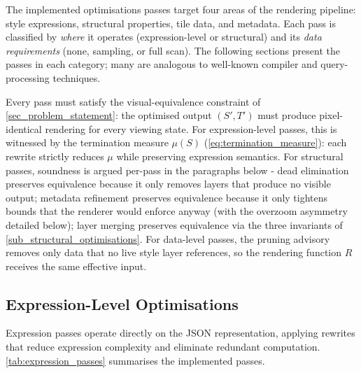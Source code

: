 The implemented optimisations passes target four areas of the rendering pipeline: style expressions, structural properties, tile data, and metadata.
Each pass is classified by \emph{where} it operates (expression-level or structural) and its \emph{data requirements} (none, sampling, or full scan).
The following sections present the passes in each category; many are analogous to well-known compiler and query-processing techniques.

Every pass must satisfy the visual-equivalence constraint of \cref{sec_problem_statement}: the optimised output $(S', T')$ must produce pixel-identical rendering for every viewing state.
For expression-level passes, this is witnessed by the termination measure $\mu(S)$ (\cref{eq:termination_measure}): each rewrite strictly reduces $\mu$ while preserving expression semantics.
For structural passes, soundness is argued per-pass in the paragraphs below - dead elimination preserves equivalence because it only removes layers that produce no visible output; metadata refinement preserves equivalence because it only tightens bounds that the renderer would enforce anyway (with the overzoom asymmetry detailed below); layer merging preserves equivalence via the three invariants of \cref{sub_structural_optimisations}.
For data-level passes, the pruning advisory removes only data that no live style layer references, so the rendering function $R$ receives the same effective input.

\subsection{Expression-Level Optimisations}\label{sub_expression_optimisations}

Expression passes operate directly on the JSON representation, applying rewrites that reduce expression complexity and eliminate redundant computation.
\cref{tab:expression_passes} summarises the implemented passes.

